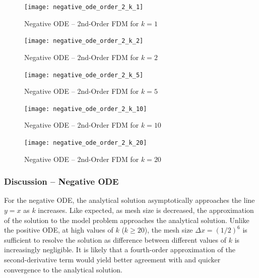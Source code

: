 \documentclass[10pt, reqno]{article}		%
\numberwithin{equation}{section}
\begin{document}
\begin{figure}[H]
	\begin{center}
		\texttt{[image: negative\_ode\_order\_2\_k\_1]}
		\caption{Negative ODE -- 2nd-Order FDM for $k = 1$}
	\end{center}
\end{figure}

\begin{figure}[H]
	\begin{center}
		\texttt{[image: negative\_ode\_order\_2\_k\_2]}
		\caption{Negative ODE -- 2nd-Order FDM for $k = 2$}
	\end{center}
\end{figure}

\vfill

\begin{figure}[H]
	\begin{center}
		\texttt{[image: negative\_ode\_order\_2\_k\_5]}
		\caption{Negative ODE -- 2nd-Order FDM for $k = 5$}
	\end{center}
\end{figure}

\begin{figure}[H]
	\begin{center}
		\texttt{[image: negative\_ode\_order\_2\_k\_10]}
		\caption{Negative ODE -- 2nd-Order FDM for $k = 10$}
	\end{center}
\end{figure}

\vfill

\begin{figure}[H]
	\begin{center}
		\texttt{[image: negative\_ode\_order\_2\_k\_20]}
		\caption{Negative ODE -- 2nd-Order FDM for $k = 20$}
	\end{center}
\end{figure}

\subsubsection{Discussion -- Negative ODE}

For the negative ODE, the analytical solution asymptotically approaches the line $y = x$ as $k$ increases. Like expected, as mesh size is decreased, the approximation of the solution to the model problem approaches the analytical solution. Unlike the positive ODE, at high values of $k$ ($k \ge 20$), the mesh size $\Delta x = (1/2)^6$ is sufficient to resolve the solution as difference between different values of $k$ is increasingly negligible. It is likely that a fourth-order approximation of the second-derivative term would yield better agreement with and quicker convergence to the analytical solution.
\end{document}
